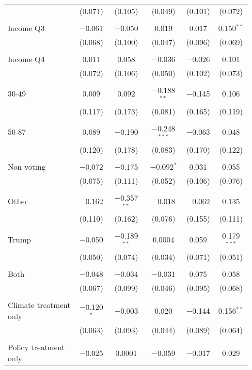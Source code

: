 \begin{tabular}{@{\extracolsep{5pt}}lccccc}
  & (0.071) & (0.105) & (0.049) & (0.101) & (0.072) \\ 
  & & & & & \\ 
 Income Q3 & $-$0.061 & $-$0.050 & 0.019 & 0.017 & 0.150$^{**}$ \\ 
  & (0.068) & (0.100) & (0.047) & (0.096) & (0.069) \\ 
  & & & & & \\ 
 Income Q4 & 0.011 & 0.058 & $-$0.036 & $-$0.026 & 0.101 \\ 
  & (0.072) & (0.106) & (0.050) & (0.102) & (0.073) \\ 
  & & & & & \\ 
 30-49 & 0.009 & 0.092 & $-$0.188$^{**}$ & $-$0.145 & 0.106 \\ 
  & (0.117) & (0.173) & (0.081) & (0.165) & (0.119) \\ 
  & & & & & \\ 
 50-87 & 0.089 & $-$0.190 & $-$0.248$^{***}$ & $-$0.063 & 0.048 \\ 
  & (0.120) & (0.178) & (0.083) & (0.170) & (0.122) \\ 
  & & & & & \\ 
 Non voting & $-$0.072 & $-$0.175 & $-$0.092$^{*}$ & 0.031 & 0.055 \\ 
  & (0.075) & (0.111) & (0.052) & (0.106) & (0.076) \\ 
  & & & & & \\ 
 Other & $-$0.162 & $-$0.357$^{**}$ & $-$0.018 & $-$0.062 & 0.135 \\ 
  & (0.110) & (0.162) & (0.076) & (0.155) & (0.111) \\ 
  & & & & & \\ 
 Trump & $-$0.050 & $-$0.189$^{**}$ & 0.0004 & 0.059 & 0.179$^{***}$ \\ 
  & (0.050) & (0.074) & (0.034) & (0.071) & (0.051) \\ 
  & & & & & \\ 
 Both & $-$0.048 & $-$0.034 & $-$0.031 & 0.075 & 0.058 \\ 
  & (0.067) & (0.099) & (0.046) & (0.095) & (0.068) \\ 
  & & & & & \\ 
 Climate treatment only & $-$0.120$^{*}$ & $-$0.003 & 0.020 & $-$0.144 & 0.156$^{**}$ \\ 
  & (0.063) & (0.093) & (0.044) & (0.089) & (0.064) \\ 
  & & & & & \\ 
 Policy treatment only & $-$0.025 & 0.0001 & $-$0.059 & $-$0.017 & 0.029 \\ 

\end{tabular}
